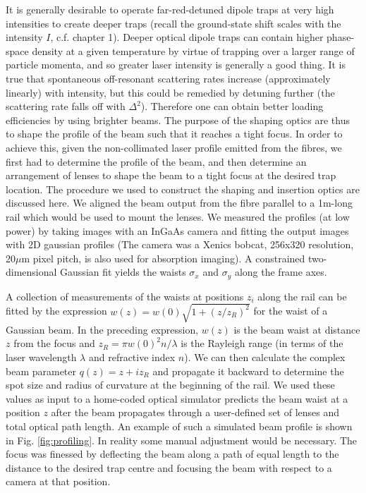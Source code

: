 	It is generally desirable to operate far-red-detuned dipole traps at very high intensities to create deeper traps (recall the ground-state shift scales with the intensity $I$, c.f.
	chapter 1).
	Deeper optical dipole traps can contain higher phase-space density at a given temperature by virtue of trapping over a larger range of particle momenta, and so greater laser intensity is generally a good thing.
	It is true that spontaneous off-resonant scattering rates increase (approximately linearly) with intensity, but this could be remedied by detuning further (the scattering rate falls off with $\Delta^2$).
	Therefore one can obtain better loading efficiencies by using brighter beams.
	The purpose of the shaping optics are thus to shape the profile of the beam such that it reaches a tight focus.
	In order to achieve this, given the non-collimated laser profile emitted from the fibres, we first had to determine the profile of the beam, and then determine an arrangement of lenses to shape the beam to a tight focus at the desired trap location.
	The procedure we used to construct the shaping and insertion optics are discussed here.
	We aligned the beam output from the fibre parallel to a 1m-long rail which would be used to mount the lenses.
	We measured the profiles (at low power) by taking images with an InGaAs camera and fitting the output images with 2D gaussian profiles (The camera was a  Xenics bobcat, 256x320 resolution, 20$\mu$m pixel pitch, is also used for absorption imaging).
	A constrained two-dimensional Gaussian fit yields the waists $\sigma_x$ and $\sigma_y$ along the frame axes.
	

	
	A collection of measurements of the waists at positions $z_i$ along the rail can be fitted by the expression $w(z) = w(0)\sqrt{1 + (z/z_R)^2}$ for the waist of a Gaussian beam.
	In the preceding expression, $w(z)$ is the beam waist at distance $z$ from the focus and $z_R=\pi w(0)^2n/\lambda$ is the Rayleigh range (in terms of the laser wavelength $\lambda$ and refractive index $n$).
	We can then calculate the complex beam parameter $q(z) = z + i z_R$ and propagate it backward to determine the spot size and radius of curvature at the beginning of the rail.
	We used these values as input to a home-coded optical simulator predicts the beam waist at a position $z$ after the beam propagates through a user-defined set of lenses and total optical path length.
	An example of such a simulated beam profile is shown in Fig. \ref{fig:profiling}.
	In reality some manual adjustment would be necessary.
	The focus was finessed by deflecting the beam along a path of equal length to the distance to the desired trap centre and focusing the beam with respect to a camera at that position.

